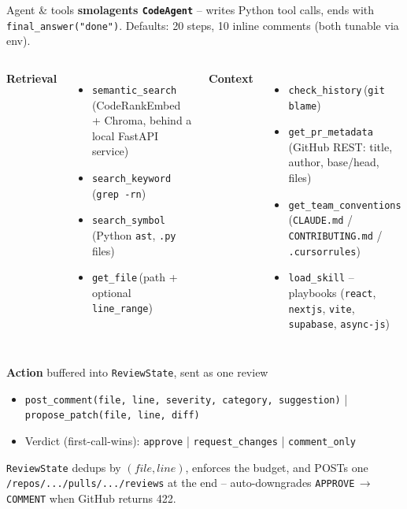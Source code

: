 \documentclass[10pt,aspectratio=169]{beamer}
\begin{document}
\begin{frame}{Agent \& tools}
  \textbf{smolagents \texttt{CodeAgent}} -- writes Python tool calls, ends with
  \texttt{final\_answer("done")}.\;
  Defaults: \alert{20 steps}, \alert{10 inline comments} (both tunable via env).
  \vspace{0.3em}
  \begin{columns}[T,onlytextwidth]
      \textbf{\small Retrieval}
      \begin{itemize}\scriptsize
        \item \texttt{semantic\_search}\,(CodeRankEmbed + Chroma, behind a local FastAPI service)
        \item \texttt{search\_keyword}\,(\texttt{grep -rn})
        \item \texttt{search\_symbol}\,(Python \texttt{ast}, \texttt{.py} files)
        \item \texttt{get\_file}\,(path + optional \texttt{line\_range})
      \end{itemize}
      \textbf{\small Context}
      \begin{itemize}\scriptsize
        \item \texttt{check\_history}\,(\texttt{git blame})
        \item \texttt{get\_pr\_metadata}\,(GitHub REST: title, author, base/head, files)
        \item \texttt{get\_team\_conventions}\,(\texttt{CLAUDE.md} / \texttt{CONTRIBUTING.md} / \texttt{.cursorrules})
        \item \texttt{load\_skill} -- playbooks (\texttt{react}, \texttt{nextjs}, \texttt{vite}, \texttt{supabase}, \texttt{async-js})
      \end{itemize}
  \end{columns}
  \vspace{0.3em}
  \textbf{\small Action} \;\textcolor{mute}{\scriptsize buffered into \texttt{ReviewState}, sent as one review}
  \begin{itemize}\scriptsize
    \item \texttt{post\_comment(file, line, severity, category, suggestion)} \;|\; \texttt{propose\_patch(file, line, diff)}
    \item Verdict (\alert{first-call-wins}): \texttt{approve} \;|\; \texttt{request\_changes} \;|\; \texttt{comment\_only}
  \end{itemize}
  \vspace{0.2em}
  \footnotesize \texttt{ReviewState} dedups by $(file, line)$, enforces the budget, and POSTs one
  \texttt{/repos/.../pulls/.../reviews} at the end -- auto-downgrades \texttt{APPROVE}\,$\rightarrow$\,\texttt{COMMENT} when GitHub returns 422.
\end{frame}
\end{document}
